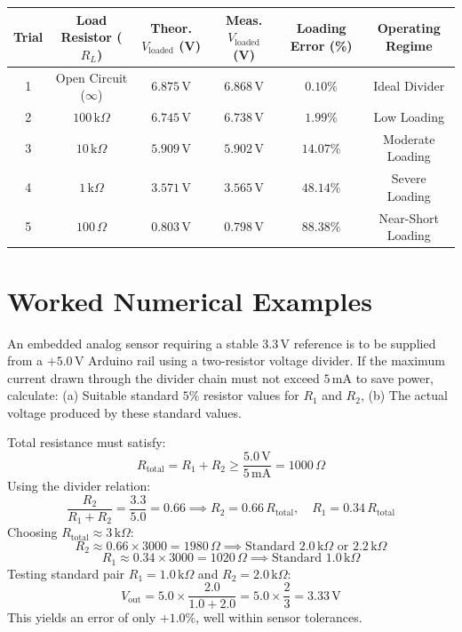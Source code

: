 \begin{observationtable}[Observation Table 2.1: Voltage Divider Loading Data ($V_{\mathrm{in}} = 10.0\,\mathrm{V}, R_1 = 1\,\mathrm{k}\Omega, R_2 = 2.2\,\mathrm{k}\Omega$)]
\begin{center}
\begin{tabular}{cccccc}
\toprule
\textbf{Trial} & \textbf{Load Resistor ($R_L$)} & \textbf{Theor. $V_{\mathrm{loaded}}$ (V)} & \textbf{Meas. $V_{\mathrm{loaded}}$ (V)} & \textbf{Loading Error (\%)} & \textbf{Operating Regime} \\
\midrule
1 & Open Circuit ($\infty$) & $6.875\,\mathrm{V}$ & $6.868\,\mathrm{V}$ & $0.10\%$ & Ideal Divider \\
2 & $100\,\mathrm{k}\Omega$ & $6.745\,\mathrm{V}$ & $6.738\,\mathrm{V}$ & $1.99\%$ & Low Loading \\
3 & $10\,\mathrm{k}\Omega$ & $5.909\,\mathrm{V}$ & $5.902\,\mathrm{V}$ & $14.07\%$ & Moderate Loading \\
4 & $1\,\mathrm{k}\Omega$ & $3.571\,\mathrm{V}$ & $3.565\,\mathrm{V}$ & $48.14\%$ & Severe Loading \\
5 & $100\,\Omega$ & $0.803\,\mathrm{V}$ & $0.798\,\mathrm{V}$ & $88.38\%$ & Near-Short Loading \\
\bottomrule
\end{tabular}
\end{center}
\end{observationtable}

\section{Worked Numerical Examples}
\begin{example}
An embedded analog sensor requiring a stable $3.3\,\mathrm{V}$ reference is to be supplied from a $+5.0\,\mathrm{V}$ Arduino rail using a two-resistor voltage divider. If the maximum current drawn through the divider chain must not exceed $5\,\mathrm{mA}$ to save power, calculate: (a) Suitable standard $5\%$ resistor values for $R_1$ and $R_2$, (b) The actual voltage produced by these standard values.
\end{example}
\begin{solutionbox}
Total resistance must satisfy:
\[ R_{\mathrm{total}} = R_1 + R_2 \ge \frac{5.0\,\mathrm{V}}{5\,\mathrm{mA}} = 1000\,\Omega \]
Using the divider relation:
\[ \frac{R_2}{R_1 + R_2} = \frac{3.3}{5.0} = 0.66 \implies R_2 = 0.66\,R_{\mathrm{total}}, \quad R_1 = 0.34\,R_{\mathrm{total}} \]
Choosing $R_{\mathrm{total}} \approx 3\,\mathrm{k}\Omega$:
\[ R_2 \approx 0.66 \times 3000 = 1980\,\Omega \implies \text{Standard } 2.0\,\mathrm{k}\Omega \text{ or } 2.2\,\mathrm{k}\Omega \]
\[ R_1 \approx 0.34 \times 3000 = 1020\,\Omega \implies \text{Standard } 1.0\,\mathrm{k}\Omega \]
Testing standard pair $R_1 = 1.0\,\mathrm{k}\Omega$ and $R_2 = 2.0\,\mathrm{k}\Omega$:
\[ V_{\mathrm{out}} = 5.0 \times \frac{2.0}{1.0 + 2.0} = 5.0 \times \frac{2}{3} = 3.33\,\mathrm{V} \]
This yields an error of only $+1.0\%$, well within sensor tolerances.
\end{solutionbox}

